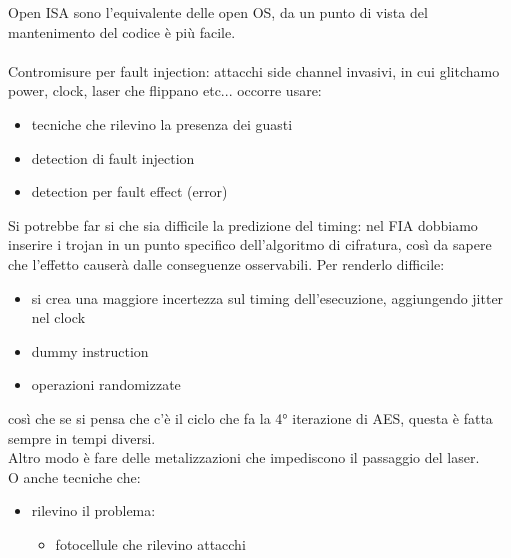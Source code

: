 \documentclass[oneside, 12pt]{extbook}
\begin{document}
Open ISA sono l'equivalente delle open OS, da un punto di vista del mantenimento del codice è più facile.\\\\
Contromisure per fault injection: attacchi side channel invasivi, in cui glitchamo power, clock, laser che flippano etc... occorre usare:
\begin{itemize}
	\item tecniche che rilevino la presenza dei guasti
	\item detection di fault injection
	\item detection per fault effect (error)
\end{itemize}
Si potrebbe far si che sia difficile la predizione del timing: nel FIA dobbiamo inserire i trojan in un punto specifico dell'algoritmo di cifratura, così da sapere che l'effetto causerà dalle conseguenze osservabili. Per renderlo difficile:
\begin{itemize}
	\item si crea una maggiore incertezza sul timing dell'esecuzione, aggiungendo jitter nel clock
	\item dummy instruction
	\item operazioni randomizzate
\end{itemize}
così che se si pensa che c'è il ciclo che fa la 4° iterazione di AES, questa è fatta sempre in tempi diversi.\\Altro modo è fare delle metalizzazioni che impediscono il passaggio del laser.\\O anche tecniche che:
\begin{itemize}
	\item rilevino il problema:
	\begin{itemize}
		\item fotocellule che rilevino attacchi
	\end{itemize} 
\end{itemize}
\end{document}
